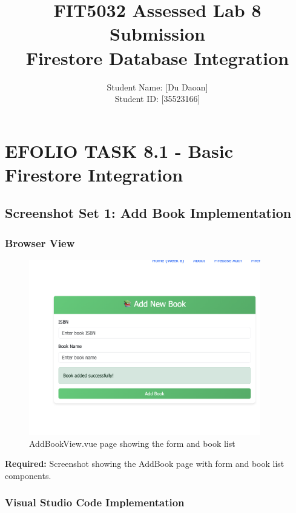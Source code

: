 \documentclass[11pt,a4paper]{article}
\title{\textbf{FIT5032 Assessed Lab 8 Submission\\Firestore Database Integration}}
\author{Student Name: [Du Daoan]\\Student ID: [35523166]}
\date{}
\begin{document}
\maketitle


\section{EFOLIO TASK 8.1 - Basic Firestore Integration}

\subsection{Screenshot Set 1: Add Book Implementation}

\subsubsection{Browser View}
\begin{figure}[H]
    \centering
    \includegraphics[width=0.9\textwidth]{add_book_browser.png}
    \caption{AddBookView.vue page showing the form and book list}
    \label{fig:add_book_browser}
\end{figure}

\textbf{Required:} Screenshot showing the AddBook page with form and book list components.

\subsubsection{Visual Studio Code Implementation}
\end{document}

